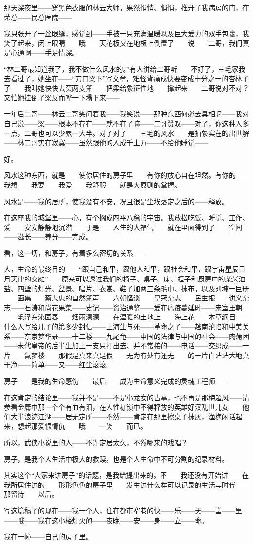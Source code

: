\par 那天深夜里——穿黑色衣服的林云大师，果然悄悄、悄悄，推开了我病房的门，在荣总——民总医院——
\par 我只张开了一丝眼缝，感觉到——手被一只充满温暖以及巨大爱力的双手包裹，我笑了起来，闭上眼睛——哦——天花板又在地板上倒置了——说——二哥，我们真是心通啊——手足情深。
\par “林二哥最知道我了，我不做什么风水的。”有人讲给二哥听——不好了，三毛家我去看过了，她坐在——“刀口梁下”写文章，难怪背痛成快要变成十分之一的杏林子了——我叫她快快去买两支箫——把梁给象征性地——撑起来——二哥说对不对？又怕她挂倒了梁反而哗一下塌下来——
\par 一年后二哥——林云二哥笑问着我——我笑说——那种东西何必去具相呢——我对自己说——梁——根本不存在——就不在了嘛——二哥赞叹——对了，你这种人多一点，二哥也可以少累一大半。对了对了——三毛的风水——是抽象实在的出世解——林二哥实在寂寞——虽然跟他的人成千上万——不给他睡觉——
\par 好。
\par 风水这种东西，就是——使你居住的房子里——有你的放心自在坦然。有你的——我想——我要——我爱——我舒服——就是大原则的掌握。
\par 风水是——我的居所，使我没有不安，况且很是尘埃落定之后的——释放。
\par 在这座我的城堡里——心，有个搁成四平八稳的宇宙。我放松吃饭、睡觉、工作、爱——安安静静地沉潜——于是——人生的大福气——就在里面得到了——空间——滋长——养分——完成。
\par 看，这一切，和房子，有着多么密切的关系——
\par 人，生命的最终目的——“跟自己和平，跟他人和平，跟社会和平，跟宇宙星辰日月天律的交融”——原来可以透过我们的椅子、桌子、床、柜子和厨房中的柴米油盐、四壁的灯光、盆景、唱片、衣裳、鞋子加两三条毛巾、抹布，以及刘墉一巨册——画集——蔡志忠的自然箫声——六朝怪谈——皇冠杂志——民生报——讲义杂志——石涛和尚花果集——史记——资治通鉴——爱在瘟疫蔓延时——宋室王朝——毛泽东沁园春——烟雨濛濛——在温暖的土地上——海上花——本草纲目——什么人写给儿子的第多少封信——上海生与死——革命之子——越南沦陷和中美关系——东京梦华录——十二楼——九尾龟——中国的法律与中国的社会——肉蒲团——末代皇帝的后半生加上一支只打出去、并不常接的——电话——交织成——一片——氤梦楼——那假是真来真是假——无为有处有还无——的一片白茫茫大地真干净——简单——又——红尘滚滚。
\par 房子——是我的生命感伤——最后——成为生命意义完成的灵魂工程师——
\par 在这肯定的结论里——我并不是——不是小龙女的古墓，也不再是那梅超风——请参看金庸中那一个个有血有泪，在人性枷锁中不得释放的英雄好汉乱世儿女——他们大半浪迹江湖——居无定所——不然——肯定在那里擦桌子抹灰，渔樵闲话起来，想起那爱恨情仇——哦——一笑——而已。
\par 所以，武侠小说里的人——不许定居太久，不然哪来的戏唱？
\par 房子，是我个人生活中极大的救赎。也是个人生命中不可分割的纪录材料。
\par 其实这个“大家来讲房子”的话题，是我给提出来的。不——我还没有开始讲——在我所居住过的——形形色色的房子里——发生过什么样可以记录的生活与时代——那留待——以后。
\par 写这篇稿子的现在——我一个人，住在都市窄巷的快——乐——天——堂——里——哦——我在这小楼灯火的——夜晚——安——身——立——命。
\par 我在一幢——自己的房子里。




